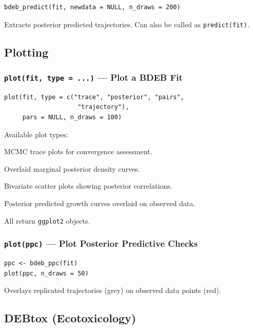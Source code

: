 \documentclass[11pt,a4paper]{article}
\newcommand{\code}[1]{\texttt{#1}}
\begin{document}
\begin{lstlisting}
bdeb_predict(fit, newdata = NULL, n_draws = 200)
\end{lstlisting}

Extracts posterior predicted trajectories.  Can also be called as
\code{predict(fit)}.

\subsection{Plotting}

\subsubsection{\code{plot(fit, type = ...)} --- Plot a BDEB Fit}

\begin{lstlisting}
plot(fit, type = c("trace", "posterior", "pairs",
                    "trajectory"),
     pars = NULL, n_draws = 100)
\end{lstlisting}

Available plot types:
\begin{description}[nosep,leftmargin=3cm]
  \item[\code{"trace"}] MCMC trace plots for convergence assessment.
  \item[\code{"posterior"}] Overlaid marginal posterior density curves.
  \item[\code{"pairs"}] Bivariate scatter plots showing posterior correlations.
  \item[\code{"trajectory"}] Posterior predicted growth curves overlaid on observed data.
\end{description}

All return \code{ggplot2} objects.

\subsubsection{\code{plot(ppc)} --- Plot Posterior Predictive Checks}

\begin{lstlisting}
ppc <- bdeb_ppc(fit)
plot(ppc, n_draws = 50)
\end{lstlisting}

Overlays replicated trajectories (grey) on observed data points (red).

\subsection{DEBtox (Ecotoxicology)}
\end{document}
